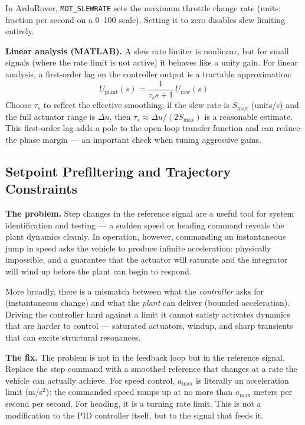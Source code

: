 \documentclass[12pt]{article}
\begin{document}
In ArduRover, \texttt{MOT\_SLEWRATE} sets the maximum throttle change rate
(units: fraction per second on a 0--100 scale).  Setting it to zero disables
slew limiting entirely.

\textbf{Linear analysis (MATLAB).}
A slew rate limiter is nonlinear, but for small signals (where the rate limit
is not active) it behaves like a unity gain.  For linear analysis, a
first-order lag on the controller output is a tractable approximation:
\begin{equation}
  U_\mathrm{plant}(s) = \frac{1}{\tau_s s + 1}\,U_\mathrm{raw}(s)
  \label{eq:slewrate_linear}
\end{equation}
Choose $\tau_s$ to reflect the effective smoothing: if the slew rate is
$S_\mathrm{max}$ (units/s) and the full actuator range is $\Delta u$, then
$\tau_s \approx \Delta u / (2 S_\mathrm{max})$ is a reasonable estimate.
This first-order lag adds a pole to the open-loop transfer function and can
reduce the phase margin --- an important check when tuning aggressive gains.

\subsection{Setpoint Prefiltering and Trajectory Constraints}

\textbf{The problem.}
Step changes in the reference signal are a useful tool for system
identification and testing --- a sudden speed or heading command reveals the
plant dynamics cleanly.  In operation, however, commanding an instantaneous
jump in speed asks the vehicle to produce infinite acceleration: physically
impossible, and a guarantee that the actuator will saturate and the integrator
will wind up before the plant can begin to respond.

More broadly, there is a mismatch between what the \emph{controller} asks for
(instantaneous change) and what the \emph{plant} can deliver (bounded
acceleration).  Driving the controller hard against a limit it cannot
satisfy activates dynamics that are harder to control --- saturated actuators,
windup, and sharp transients that can excite structural resonances.

\textbf{The fix.}
The problem is not in the feedback loop but in the reference signal.  Replace
the step command with a smoothed reference that changes at a rate the vehicle
can actually achieve.  For speed control, $a_\mathrm{max}$ is literally an
acceleration limit (m/s$^2$): the commanded speed ramps up at no more than
$a_\mathrm{max}$ meters per second per second.  For heading, it is a turning
rate limit.  This is not a modification to the PID controller itself, but to
the signal that feeds it.
\end{document}
